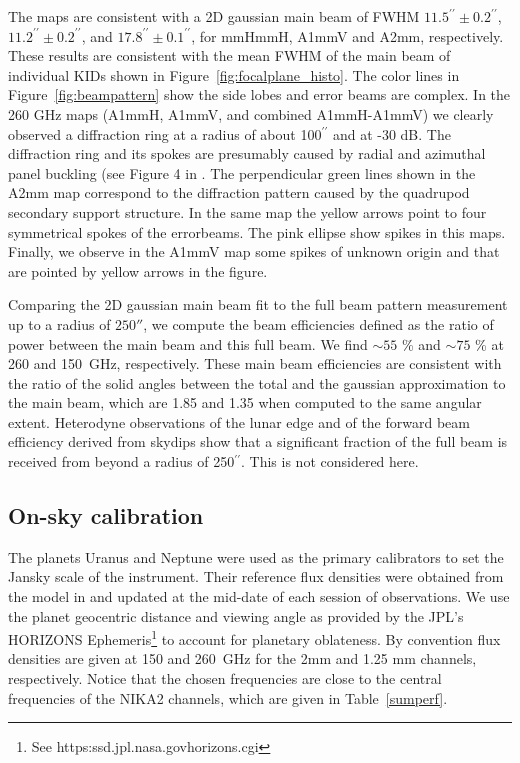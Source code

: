 \documentclass[]{aa} %
\begin{document}
The maps are consistent with a 2D gaussian main beam of FWHM $11.5^{\prime \prime} \pm 0.2^{\prime \prime}$, $11.2^{\prime \prime} \pm 0.2^{\prime \prime}$, and $17.8^{\prime \prime} \pm 0.1^{\prime \prime}$, for mmHmmH, A1mmV and A2mm, respectively. These results are consistent with the mean FWHM of the main beam of individual KIDs shown in Figure~\ref{fig:focalplane_histo}.
The color lines in Figure~\ref{fig:beampattern} show the side lobes and error beams are complex. In the 260 GHz maps (A1mmH, A1mmV, and combined A1mmH-A1mmV) we clearly observed a diffraction ring at a radius of about 100$^{\prime \prime}$ and at -30 dB. The diffraction ring and its spokes are presumably caused by radial and azimuthal panel buckling (see Figure 4 in \cite{greve1998}. The perpendicular green lines shown in the A2mm map correspond to the diffraction pattern caused by the quadrupod secondary support structure. In the same map the yellow arrows point to four symmetrical spokes of the errorbeams. The pink ellipse show spikes in this maps. Finally, we observe in the A1mmV map some spikes of unknown origin and that are pointed by yellow arrows in the figure.

Comparing the 2D gaussian main beam fit to the full beam pattern measurement up to a radius of
$250''$, we compute the beam efficiencies defined as the ratio of power between the main beam and this full beam. We find $\sim 55$ \% and $\sim 75$ \% at 260 and 150~GHz, respectively.
These main beam efficiencies are consistent with the ratio of the solid angles between the total and  the gaussian approximation to the main beam, which are 1.85 and 1.35 when computed to the same angular extent.
Heterodyne observations of the lunar edge and of the forward beam efficiency derived from skydips show that a significant fraction of the full beam is received from beyond a radius of 250$^{\prime \prime}$. This is not considered here.

\subsection{On-sky calibration}
\label{On-sky calibration}

The planets Uranus and Neptune  were used as the primary calibrators to set the Jansky scale of the instrument.
Their reference flux densities were obtained from the model in \cite{moreno2010}
and updated at the mid-date of each session of observations. 
We use the planet geocentric distance
and viewing angle as provided by the JPL's HORIZONS Ephemeris\footnote{See https:\/\/ssd.jpl.nasa.gov\/horizons.cgi} to account for planetary oblateness. 
By convention flux densities are given at 150 and 260~GHz for the 2mm and 1.25 mm channels, respectively. Notice that the chosen frequencies are close to the central frequencies of the NIKA2 channels, which are given in Table~\ref{sumperf}. \\
\end{document}
